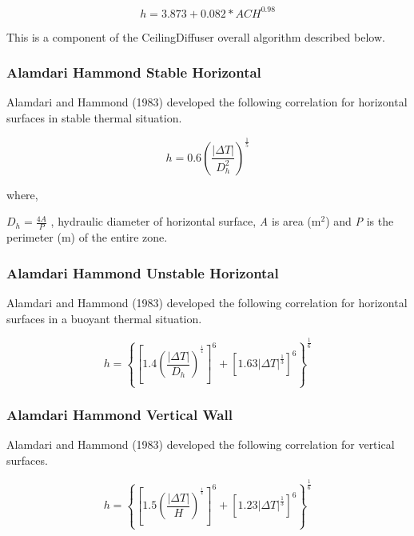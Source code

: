 \begin{equation}
h = 3.873 + 0.082 * AC{H^{0.98}}
\end{equation}

This is a component of the CeilingDiffuser overall algorithm described below.

\subsubsection{Alamdari Hammond Stable Horizontal}\label{alamdari-hammond-stable-horizontal}

Alamdari and Hammond (1983) developed the following correlation for horizontal surfaces in stable thermal situation.

\begin{equation}
h = 0.6{\left( {\frac{{\left| {\Delta T} \right|}}{{D_h^2}}} \right)^{{\frac{1}{5}}}}
\end{equation}

where,

\({D_h} = \frac{{4A}}{P}\) , hydraulic diameter of horizontal surface, \emph{A} is area (m\(^{2}\)) and \emph{P} is the perimeter (m) of the entire zone.

\subsubsection{Alamdari Hammond Unstable Horizontal}\label{alamdari-hammond-unstable-horizontal}

Alamdari and Hammond (1983) developed the following correlation for horizontal surfaces in a buoyant thermal situation.

\begin{equation}
h = {\left\{ {{{\left[ {1.4{{\left( {\frac{{\left| {\Delta T} \right|}}{{{D_h}}}} \right)}^{^{{\frac{1}{4}}}}}} \right]}^6} + {{\left[ {1.63{{\left| {\Delta T} \right|}^{{\frac{1}{3}}}}} \right]}^6}} \right\}^{{\frac{1}{6}}}}
\end{equation}

\subsubsection{Alamdari Hammond Vertical Wall}\label{alamdari-hammond-vertical-wall}

Alamdari and Hammond (1983) developed the following correlation for vertical surfaces.

\begin{equation}
h = {\left\{ {{{\left[ {1.5{{\left( {\frac{{\left| {\Delta T} \right|}}{H}} \right)}^{^{{\frac{1}{4}}}}}} \right]}^6} + {{\left[ {1.23{{\left| {\Delta T} \right|}^{{\frac{1}{3}}}}} \right]}^6}} \right\}^{{\frac{1}{6}}}}
\end{equation}

